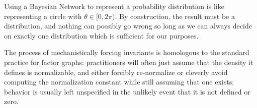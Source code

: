 \documentclass{article}
\begin{document}
	Using a Bayesian Network to represent a probability distribution is like representing a circle with $\theta \in [0, 2\pi)$. 
	By construction, the result must be a distribution, and nothing can possibly go wrong so long as we can always decide on exactly one distribution which is sufficient for our purposes.
	
	
	The process of mechanistically forcing invariants is homologous to the standard practice for factor graphs: practitioners will often just assume that the density it defines is normalizable, and either forcibly re-normalize or cleverly avoid computing the normalization constant while still assuming that one exists; behavior is usually left unspecified in the unlikely event that it is not defined or zero.
\end{document}
